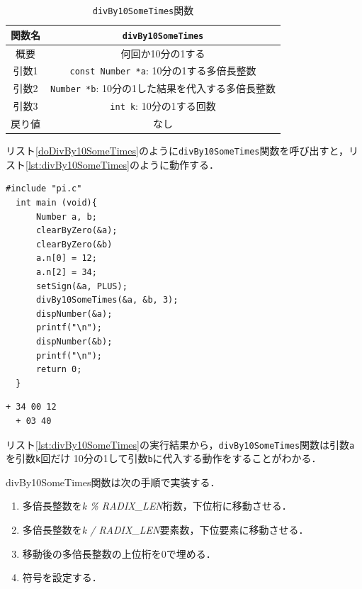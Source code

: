 \documentclass[a4paper,11pt,dvipdfmx]{jsarticle}
\begin{document}
\begin{table}[H]
\centering
\caption{\texttt{divBy10SomeTimes}関数}
\label{table:lst:divBy10SomeTimes}
\begin{tabular}{c||c}
\hline
関数名    & \texttt{divBy10SomeTimes}   \\
\hline
概要    & 何回か10分の1する   \\
\hline
引数1   & \texttt{const Number *a}: 10分の1する多倍長整数  \\
引数2   & \texttt{Number *b}: 10分の1した結果を代入する多倍長整数  \\
引数3   & \texttt{int k}: 10分の1する回数   \\
\hline
戻り値    & なし   \\
\hline
\end{tabular}
\end{table}

リスト\ref{doDivBy10SomeTimes}のように\texttt{divBy10SomeTimes}関数を呼び出すと，リスト\ref{lst:divBy10SomeTimes}のように動作する．
\begin{lstlisting}[caption=\texttt{divBy10SomeTimes}関数の呼び出し,label=doDivBy10SomeTimes]
  #include "pi.c"
  int main (void){
      Number a, b;
      clearByZero(&a);
      clearByZero(&b)
      a.n[0] = 12;
      a.n[2] = 34;
      setSign(&a, PLUS);
      divBy10SomeTimes(&a, &b, 3);
      dispNumber(&a);
      printf("\n");
      dispNumber(&b);
      printf("\n");
      return 0;
  }
\end{lstlisting}

\begin{lstlisting}[caption=リスト\ref{doDivBy10SomeTimes}の実行結果,label=lst:divBy10SomeTimes]
  + 34 00 12
  + 03 40
\end{lstlisting}

リスト\ref{lst:divBy10SomeTimes}の実行結果から，\texttt{divBy10SomeTimes}関数は引数\texttt{a}を引数\texttt{k}回だけ
10分の1して引数\texttt{b}に代入する動作をすることがわかる．

divBy10SomeTimes関数は次の手順で実装する．

\begin{enumerate}
    \item 多倍長整数を\textit{k \% RADIX\_LEN}桁数，下位桁に移動させる．
    \item 多倍長整数を\textit{k / RADIX\_LEN}要素数，下位要素に移動させる．
    \item 移動後の多倍長整数の上位桁を0で埋める．
    \item 符号を設定する．
\end{enumerate}
\end{document}
